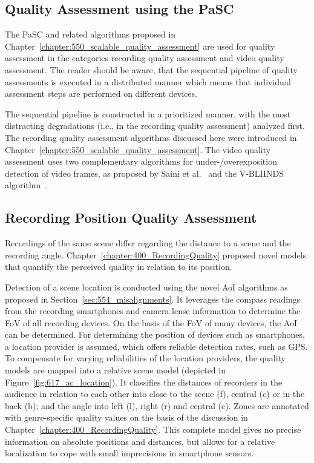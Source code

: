 \subsection{Quality Assessment using the PaSC}
The \ac{PaSC} and related algorithms proposed in Chapter~\ref{chapter:550_scalable_quality_assessment} are used for quality assessment in the categories recording quality assessment and video quality assessment. %
The reader should be aware, that the sequential pipeline of quality assessments is executed in a distributed manner which means that individual assessment steps are performed on different devices.

The sequential pipeline is constructed in a prioritized manner, with the most distracting degradations (i.e., in the recording quality assessment) analyzed first.
The recording quality assessment algorithms discussed here were introduced in Chapter~\ref{chapter:550_scalable_quality_assessment}.
The video quality assessment uses two complementary algorithms for under-/overexposition detection of video frames, as proposed by Saini et al.~\cite{Saini2012} and the \ac{V-BLIINDS} algorithm~\cite{Saad2012}.
\subsection{Recording Position Quality Assessment}
\label{sec:617_recordingQualityLocation}
Recordings of the same scene differ regarding the distance to a scene and the recording angle.
Chapter~\ref{chapter:400_RecordingQuality} proposed novel models that quantify the perceived quality in relation to its position.

Detection of a scene location is conducted using the novel \ac{AoI} algorithms as proposed in Section~\ref{sec:554_misalignments}.
It leverages the compass readings from the recording smartphones and camera lense information to determine the \ac{FoV} of all recording devices.
On the basis of the \ac{FoV} of many devices, the \ac{AoI} can be determined.
For determining the position of devices such as smartphones, a location provider is assumed, which offers reliable detection rates, such as \ac{GPS}. 
To compensate for varying reliabilities of the location providers, the quality models are mapped into a relative scene model (depicted in Figure~\ref{fig:617_ac_location}).
It classifies the distances of recorders in the audience in relation to each other into close to the scene (f), central (c) or in the back (b); and the angle into left (l), right (r) and central (c).
Zones are annotated with genre-specific quality values on the basis of the discussion in Chapter~\ref{chapter:400_RecordingQuality}.
This complete model gives no precise information on absolute positions and distances, but allows for a relative localization to cope with small imprecisions in smartphone sensors.

